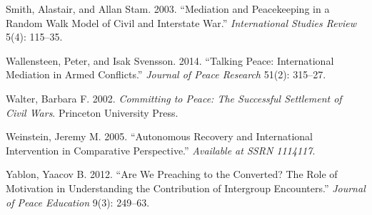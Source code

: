 \documentclass[11pt]{article}
\begin{document}
\hypertarget{ref-smith2003mediation}{}
Smith, Alastair, and Allan Stam. 2003. ``Mediation and Peacekeeping in a
Random Walk Model of Civil and Interstate War.'' \emph{International
Studies Review} 5(4): 115--35.

\hypertarget{ref-wallensteen2014talking}{}
Wallensteen, Peter, and Isak Svensson. 2014. ``Talking Peace:
International Mediation in Armed Conflicts.'' \emph{Journal of Peace
Research} 51(2): 315--27.

\hypertarget{ref-walter2002committing}{}
Walter, Barbara F. 2002. \emph{Committing to Peace: The Successful
Settlement of Civil Wars}. Princeton University Press.

\hypertarget{ref-weinstein2005autonomous}{}
Weinstein, Jeremy M. 2005. ``Autonomous Recovery and International
Intervention in Comparative Perspective.'' \emph{Available at SSRN
1114117}.

\hypertarget{ref-yablon2012we}{}
Yablon, Yaacov B. 2012. ``Are We Preaching to the Converted? The Role of
Motivation in Understanding the Contribution of Intergroup Encounters.''
\emph{Journal of Peace Education} 9(3): 249--63.
\end{document}
